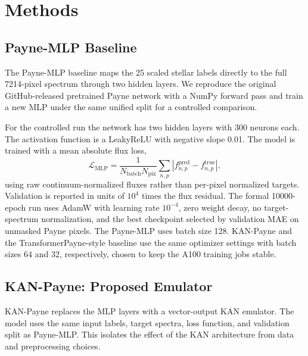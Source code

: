 \documentclass[universe,article,submit,pdftex,moreauthors]{Definitions/mdpi}
\begin{document}
\section{Methods}

\subsection{Payne-MLP Baseline}

The Payne-MLP baseline maps the 25 scaled stellar labels directly to the full
7214-pixel spectrum through two hidden layers. We reproduce the original
GitHub-released pretrained Payne network with a NumPy forward pass and train a
new MLP under the same unified split for a controlled comparison.

For the controlled run the network has two hidden layers with 300 neurons each.
The activation function is a LeakyReLU with negative slope 0.01. The model is
trained with a mean absolute flux loss,
\begin{equation}
    \label{eq:mlp-loss}
    \mathcal{L}_{\mathrm{MLP}} =
    \frac{1}{N_{\mathrm{batch}}N_{\mathrm{pix}}}
    \sum_{n,p} | f_{n,p}^{\mathrm{pred}} - f_{n,p}^{\mathrm{true}} |,
\end{equation}
using raw continuum-normalized fluxes rather than per-pixel normalized targets.
Validation is reported in units of $10^4$ times the flux residual. The formal
10000-epoch run uses AdamW with learning rate $10^{-4}$, zero weight decay, no
target-spectrum normalization, and the best checkpoint selected by validation
MAE on unmasked Payne pixels. The Payne-MLP uses batch size 128. KAN-Payne and
the TransformerPayne-style baseline use the same optimizer settings with batch
sizes 64 and 32, respectively, chosen to keep the A100 training jobs stable.

\subsection{KAN-Payne: Proposed Emulator}

KAN-Payne replaces the MLP layers with a vector-output KAN emulator. The model
uses the same input labels, target spectra, loss function, and validation split
as Payne-MLP. This isolates the effect of the KAN architecture from data and
preprocessing choices.
\end{document}
